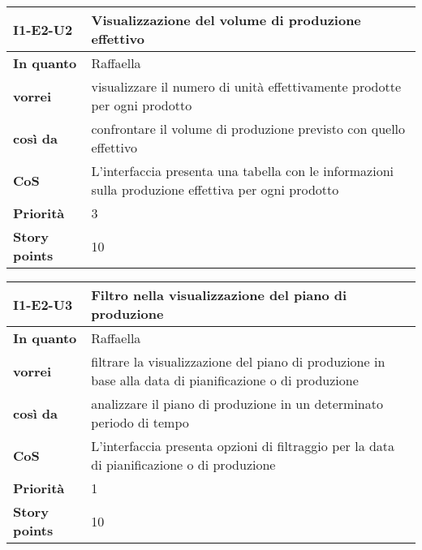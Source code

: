 \begin{table}[H]
  \begin{tabularx}{\textwidth}{lX}
    \toprule
    \textbf{I1-E2-U2} & \textbf{Visualizzazione del volume di produzione effettivo} \\
    \midrule
    \textbf{In quanto} & Raffaella \\
    \textbf{vorrei} & visualizzare il numero di unità effettivamente prodotte per ogni prodotto \\
    \textbf{così da} & confrontare il volume di produzione previsto con quello effettivo \\
    \midrule
    \textbf{CoS} & L'interfaccia presenta una tabella con le informazioni sulla produzione effettiva per ogni prodotto \\
    \midrule
    \textbf{Priorità} & 3 \\
    \textbf{Story points} & 10 \\
    \bottomrule
  \end{tabularx}
  \label{user-story:i1-e2-u2}
\end{table}

\begin{table}[H]
  \begin{tabularx}{\textwidth}{lX}
    \toprule
    \textbf{I1-E2-U3} & \textbf{Filtro nella visualizzazione del piano di produzione} \\
    \midrule
    \textbf{In quanto} & Raffaella \\
    \textbf{vorrei} & filtrare la visualizzazione del piano di produzione in base alla data di pianificazione o di produzione \\
    \textbf{così da} & analizzare il piano di produzione in un determinato periodo di tempo \\
    \midrule
    \textbf{CoS} & L'interfaccia presenta opzioni di filtraggio per la data di pianificazione o di produzione \\
    \midrule
    \textbf{Priorità} & 1 \\
    \textbf{Story points} & 10 \\
    \bottomrule
  \end{tabularx}
  \label{user-story:i1-e2-u3}
\end{table}

